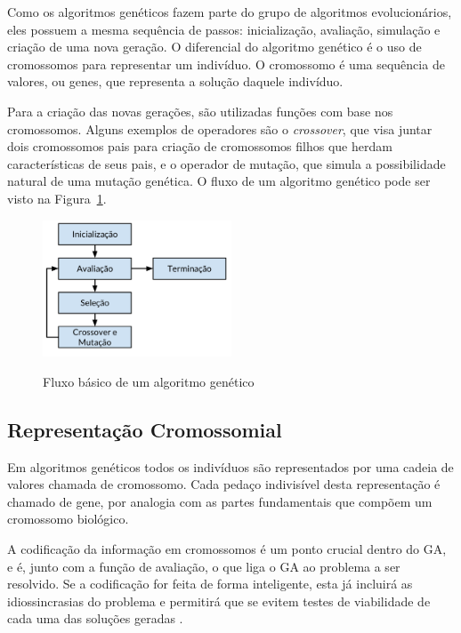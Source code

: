 \documentclass[12pt,oneside,a4paper,english,french,spanish,brazil,]{abntex2}
\begin{document}
Como os algoritmos genéticos fazem parte do grupo de algoritmos evolucionários, eles possuem a mesma sequência de passos: inicialização, avaliação, simulação e criação de uma nova geração. O diferencial do algoritmo genético é o uso de cromossomos para representar um indivíduo. O cromossomo é uma sequência de valores, ou genes, que representa a solução daquele indivíduo.

Para a criação das novas gerações, são utilizadas funções com base nos cromossomos. Alguns exemplos de operadores são o \textit{crossover}, que visa juntar dois cromossomos pais para criação de cromossomos filhos que herdam características de seus pais, e o operador de mutação, que simula a possibilidade natural de uma mutação genética. O fluxo de um algoritmo genético pode ser visto na Figura~\ref{fig:GA_Fluxo}.

\begin{figure}[ht]
\centering
\caption{Fluxo básico de um algoritmo genético}
\includegraphics[width=0.5\textwidth]{imagens/GA_Fluxo.pdf}
\label{fig:GA_Fluxo}
\end{figure}

\subsection{Representação Cromossomial}

Em algoritmos genéticos todos os indivíduos são representados por uma cadeia de valores chamada de cromossomo. Cada pedaço indivisível desta representação é chamado de gene, por analogia com as partes fundamentais que compõem um cromossomo biológico.

A codificação da informação em cromossomos é um ponto crucial dentro do GA, e é, junto com a função de avaliação, o que liga o GA ao problema a ser resolvido. Se a codificação for feita de forma inteligente, esta já incluirá as idiossincrasias do problema e permitirá que se evitem testes de viabilidade de cada uma das soluções geradas \cite{linden:2008}.
\end{document}

